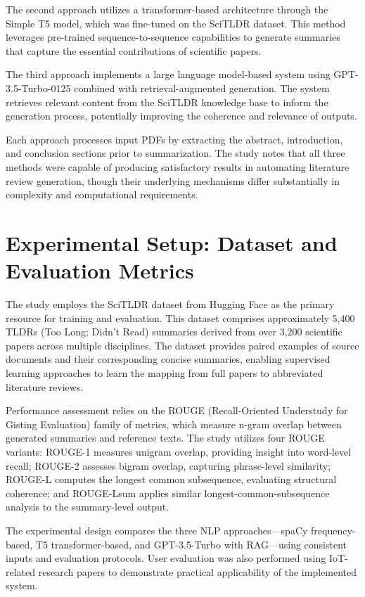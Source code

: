 \documentclass{article}
\begin{document}
The second approach utilizes a transformer-based architecture through the Simple T5 model, which was fine-tuned on the SciTLDR dataset. This method leverages pre-trained sequence-to-sequence capabilities to generate summaries that capture the essential contributions of scientific papers.

The third approach implements a large language model-based system using GPT-3.5-Turbo-0125 combined with retrieval-augmented generation. The system retrieves relevant content from the SciTLDR knowledge base to inform the generation process, potentially improving the coherence and relevance of outputs.

Each approach processes input PDFs by extracting the abstract, introduction, and conclusion sections prior to summarization. The study notes that all three methods were capable of producing satisfactory results in automating literature review generation, though their underlying mechanisms differ substantially in complexity and computational requirements.

\section{Experimental Setup: Dataset and Evaluation Metrics}
The study employs the SciTLDR dataset from Hugging Face as the primary resource for training and evaluation. This dataset comprises approximately 5,400 TLDRs (Too Long; Didn't Read) summaries derived from over 3,200 scientific papers across multiple disciplines. The dataset provides paired examples of source documents and their corresponding concise summaries, enabling supervised learning approaches to learn the mapping from full papers to abbreviated literature reviews.

Performance assessment relies on the ROUGE (Recall-Oriented Understudy for Gisting Evaluation) family of metrics, which measure n-gram overlap between generated summaries and reference texts. The study utilizes four ROUGE variants: ROUGE-1 measures unigram overlap, providing insight into word-level recall; ROUGE-2 assesses bigram overlap, capturing phrase-level similarity; ROUGE-L computes the longest common subsequence, evaluating structural coherence; and ROUGE-Lsum applies similar longest-common-subsequence analysis to the summary-level output.

The experimental design compares the three NLP approaches—spaCy frequency-based, T5 transformer-based, and GPT-3.5-Turbo with RAG—using consistent inputs and evaluation protocols. User evaluation was also performed using IoT-related research papers to demonstrate practical applicability of the implemented system.
\end{document}
